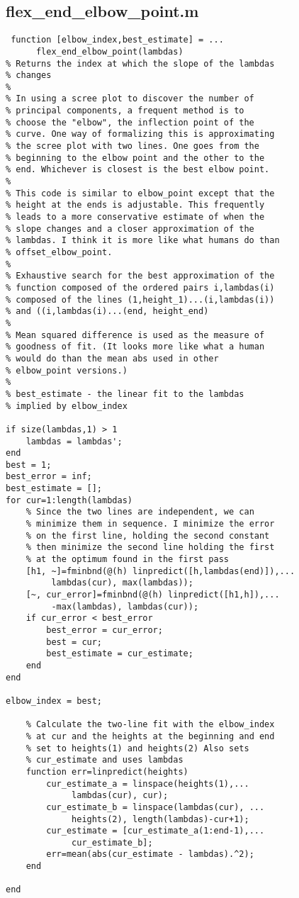 \documentclass[10pt,letterpaper]{book}
\begin{document}
\subsection{flex\_end\_elbow\_point.m}
\begin{lstlisting}
 function [elbow_index,best_estimate] = ...
      flex_end_elbow_point(lambdas)
% Returns the index at which the slope of the lambdas
% changes
%
% In using a scree plot to discover the number of
% principal components, a frequent method is to
% choose the "elbow", the inflection point of the
% curve. One way of formalizing this is approximating
% the scree plot with two lines. One goes from the
% beginning to the elbow point and the other to the
% end. Whichever is closest is the best elbow point.
%
% This code is similar to elbow_point except that the
% height at the ends is adjustable. This frequently
% leads to a more conservative estimate of when the
% slope changes and a closer approximation of the
% lambdas. I think it is more like what humans do than
% offset_elbow_point.
%
% Exhaustive search for the best approximation of the
% function composed of the ordered pairs i,lambdas(i)
% composed of the lines (1,height_1)...(i,lambdas(i))
% and ((i,lambdas(i)...(end, height_end)
%
% Mean squared difference is used as the measure of
% goodness of fit. (It looks more like what a human
% would do than the mean abs used in other
% elbow_point versions.)
%
% best_estimate - the linear fit to the lambdas
% implied by elbow_index

if size(lambdas,1) > 1
    lambdas = lambdas';
end
best = 1;
best_error = inf;
best_estimate = [];
for cur=1:length(lambdas)
    % Since the two lines are independent, we can
    % minimize them in sequence. I minimize the error
    % on the first line, holding the second constant
    % then minimize the second line holding the first
    % at the optimum found in the first pass
    [h1, ~]=fminbnd(@(h) linpredict([h,lambdas(end)]),...
         lambdas(cur), max(lambdas));
    [~, cur_error]=fminbnd(@(h) linpredict([h1,h]),...
         -max(lambdas), lambdas(cur));
    if cur_error < best_error
        best_error = cur_error;
        best = cur;
        best_estimate = cur_estimate;
    end
end

elbow_index = best;

    % Calculate the two-line fit with the elbow_index
    % at cur and the heights at the beginning and end
    % set to heights(1) and heights(2) Also sets
    % cur_estimate and uses lambdas
    function err=linpredict(heights)
        cur_estimate_a = linspace(heights(1),...
             lambdas(cur), cur);
        cur_estimate_b = linspace(lambdas(cur), ...
             heights(2), length(lambdas)-cur+1);
        cur_estimate = [cur_estimate_a(1:end-1),...
             cur_estimate_b];
        err=mean(abs(cur_estimate - lambdas).^2);
    end

end
\end{lstlisting}
\end{document}
